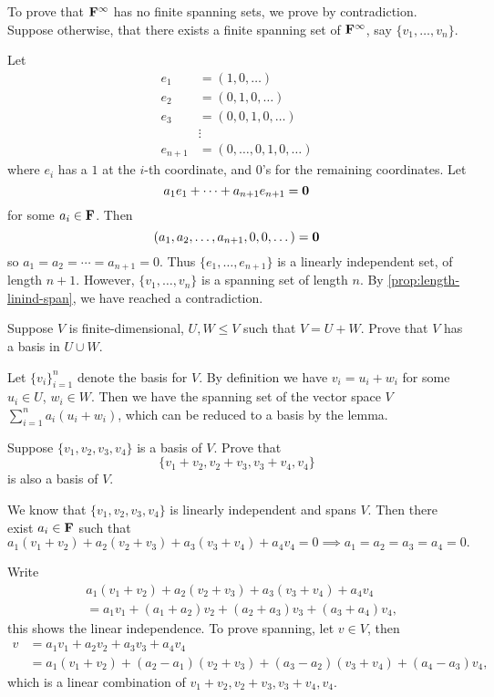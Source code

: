 \begin{solution}
To prove that $\mathbf F^\infty$ has no finite spanning sets, we prove by contradiction. Suppose otherwise, that there exists a finite spanning set of $\mathbf F^\infty$, say $\{v_1,\dots,v_n\}$.

Let
\begin{align*}
e_1&=(1,0,\dots)\\
e_2&=(0,1,0,\dots)\\
e_3&=(0,0,1,0,\dots)\\
&\vdots\\
e_{n+1}&=(0,\dots,0,1,0,\dots)
\end{align*}
where $e_i$ has a $1$ at the $i$-th coordinate, and $0$'s for the remaining coordinates. Let
\[a_1e_1+\cdots+a_{n+1}e_{n+1}=\vb{0}\]
for some $a_i\in\mathbf F$. Then
\[(a_1,a_2,\dots,a_{n+1},0,0,\dots)=\vb{0}\]
so $a_1=a_2=\cdots=a_{n+1}=0$. Thus $\{e_1,\dots,e_{n+1}\}$ is a linearly independent set, of length $n+1$. However, $\{v_1,\dots,v_n\}$ is a spanning set of length $n$. By \cref{prop:length-linind-span}, we have reached a contradiction.
\end{solution}

\begin{prbm}
Suppose $V$ is finite-dimensional, $U,W\le V$ such that $V=U+W$. Prove that $V$ has a basis in $U\cup W$.
\end{prbm}

\begin{solution}
Let $\{v_i\}_{i=1}^n$ denote the basis for $V$. By definition we have $v_i=u_i+w_i$ for some $u_i\in U$, $w_i\in W$. Then we have the spanning set of the vector space $V$ $\sum_{i=1}^{n}a_i(u_i+w_i)$, which can be reduced to a basis by the lemma.
\end{solution}

\begin{prbm}
Suppose $\{v_1,v_2,v_3,v_4\}$ is a basis of $V$. Prove that
\[\{v_1+v_2,v_2+v_3,v_3+v_4,v_4\}\]
is also a basis of $V$.
\end{prbm}

\begin{solution}
We know that $\{v_1,v_2,v_3,v_4\}$ is linearly independent and spans $V$. Then there exist $a_i\in\mathbf F$ such that
\[a_1(v_1+v_2)+a_2(v_2+v_3)+a_3(v_3+v_4)+a_4v_4=0\implies a_1=a_2=a_3=a_4=0.\]

Write
\begin{align*}
&a_1(v_1+v_2)+a_2(v_2+v_3)+a_3(v_3+v_4)+a_4v_4\\
&=a_1v_1+(a_1+a_2)v_2+(a_2+a_3)v_3+(a_3+a_4)v_4,
\end{align*}
this shows the linear independence. To prove spanning, let $v\in V$, then
\begin{align*}
v&=a_1v_1+a_2v_2+a_3v_3+a_4v_4\\
&=a_1(v_1+v_2)+(a_2-a_1)(v_2+v_3)+(a_3-a_2)(v_3+v_4)+(a_4-a_3)v_4,
\end{align*}
which is a linear combination of $v_1+v_2,v_2+v_3,v_3+v_4,v_4$.
\end{solution}

